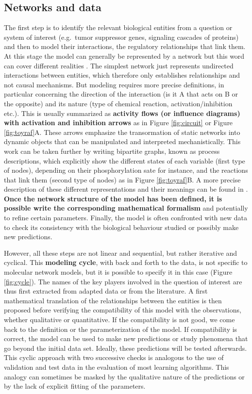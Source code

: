 \documentclass[a4paper,12pt,twoside,onecolumn,openright,final,oldfontcommands]{memoir}
\begin{document}
\subsection{Networks and data}\label{networks-and-data}

The first step is to identify the relevant biological entities from a
question or system of interest (e.g.~tumor suppressor genes, signaling
cascades of proteins) and then to model their interactions, the
regulatory relationships that link them. At this stage the model can
generally be represented by a network but this word can cover different
realities \citep{le2015quantitative}. The simplest network just
represents undirected interactions between entities, which therefore
only establishes relationships and not causal mechanisms. But modeling
requires more precise definitions, in particular concerning the
direction of the interaction (is it A that acts on B or the opposite)
and its nature (type of chemical reaction, activation/inhibition etc.).
This is usually summarized as \textbf{activity flows (or influence
diagrams) with activation and inhibition arrows} as in Figure
\ref{fig:circuit} or Figure \ref{fig:toyraf}A. These arrows emphasize
the transormation of static networks into dynamic objects that can be
manipulated and interpreted mechanistically. This work can be taken
further by writing bipartite graphs, known as process descriptions,
which explicitly show the different states of each variable (first type
of nodes), depending on their phosphorylation sate for instance, and the
reactions that link them (second type of nodes) as in Figure
\ref{fig:toyraf}B. A more precise description of these different
representations and their meanings can be found in
\citet{le2015quantitative}. \textbf{Once the network structure of the
model has been defined, it is possible write the corresponding
mathematical formalism} and potentially to refine certain parameters.
Finally, the model is often confronted with new data to check its
consistency with the biological behaviour studied or possibly make new
predictions.

However, all these steps are not linear and sequential, but rather
iterative and cyclical. This \textbf{modeling cycle}, with back and
forth to the data, is not specific to molecular network models, but it
is possible to specify it in this case (Figure \ref{fig:cycle}). The
names of the key players involved in the question of interest are thus
first extracted from adapted data or from the literature. A first
mathematical translation of the relationships between the entities is
then proposed before verifying the compatibility of this model with the
observations, whether qualitative or quantitative. If the compatibility
is not good, we come back to the definition or the parameterization of
the model. If compatibility is correct, the model can be used to make
new predictions or study phenomena that go beyond the initial data set.
Ideally, these predictions will be tested afterwards. This cyclic
approach with two successive checks is analogous to the use of
validation and test data in the evaluation of most learning algorithms.
This analogy can sometimes be masked by the qualitative nature of the
predictions or by the lack of explicit fitting of the parameters.
\end{document}
